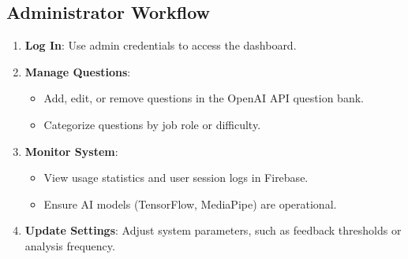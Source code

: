 \subsection{Administrator Workflow}
\begin{enumerate}
    \item \textbf{Log In}: Use admin credentials to access the dashboard.
    \item \textbf{Manage Questions}:
        \begin{itemize}
            \item Add, edit, or remove questions in the OpenAI API question bank.
            \item Categorize questions by job role or difficulty.
        \end{itemize}
    \item \textbf{Monitor System}:
        \begin{itemize}
            \item View usage statistics and user session logs in Firebase.
            \item Ensure AI models (TensorFlow, MediaPipe) are operational.
        \end{itemize}
    \item \textbf{Update Settings}: Adjust system parameters, such as feedback thresholds or analysis frequency.
\end{enumerate}

